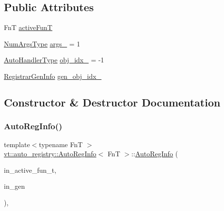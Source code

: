 \subsection*{Public Attributes}
\begin{DoxyCompactItemize}
\item 
FnT \hyperlink{structvt_1_1auto__registry_1_1_auto_reg_info_a0ce7e02e8be36c770dead608e23709c6}{active\+FunT}
\item 
\hyperlink{namespacevt_1_1auto__registry_aebda1d9d765bc9147dc654ad0712c936}{Num\+Args\+Type} \hyperlink{structvt_1_1auto__registry_1_1_auto_reg_info_a861ecaa80da263959457a5429c3a3716}{args\+\_\+} = 1
\item 
\hyperlink{namespacevt_1_1auto__registry_ae295e18699146815bb7d7674594d95d7}{Auto\+Handler\+Type} \hyperlink{structvt_1_1auto__registry_1_1_auto_reg_info_ab44c4c795cdffbc56e6e65ffab728013}{obj\+\_\+idx\+\_\+} = -\/1
\item 
\hyperlink{structvt_1_1auto__registry_1_1_registrar_gen_info}{Registrar\+Gen\+Info} \hyperlink{structvt_1_1auto__registry_1_1_auto_reg_info_a5803e0771ae948d91d73a4721fc01fcb}{gen\+\_\+obj\+\_\+idx\+\_\+}
\end{DoxyCompactItemize}


\subsection{Constructor \& Destructor Documentation}
\mbox{\label{structvt_1_1auto__registry_1_1_auto_reg_info_a5ba88723b47b540f23a5738e750fd70a}} 
\subsubsection{\texorpdfstring{Auto\+Reg\+Info()}{AutoRegInfo()}\hspace{0.1cm}{\footnotesize\ttfamily [1/2]}}
{\footnotesize\ttfamily template$<$typename FnT $>$ \\
\hyperlink{structvt_1_1auto__registry_1_1_auto_reg_info}{vt\+::auto\+\_\+registry\+::\+Auto\+Reg\+Info}$<$ FnT $>$\+::\hyperlink{structvt_1_1auto__registry_1_1_auto_reg_info}{Auto\+Reg\+Info} (\begin{DoxyParamCaption}\item[{FnT}]{in\+\_\+active\+\_\+fun\+\_\+t,  }\item[{\hyperlink{structvt_1_1auto__registry_1_1_registrar_gen_info}{Registrar\+Gen\+Info}}]{in\+\_\+gen }\end{DoxyParamCaption})\hspace{0.3cm}{\ttfamily [inline]}, {\ttfamily [explicit]}}

